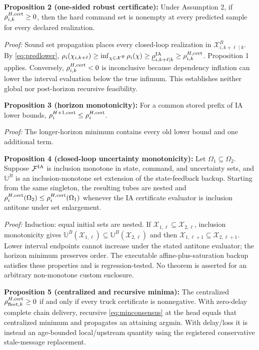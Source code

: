 \textbf{Proposition 2 (one-sided robust certificate):} Under Assumption 2, if $\rho_{i,k}^{H,{\rm cert}}\ge0$, then the hard command set is nonempty at every predicted sample for every declared realization.

\emph{Proof:} Sound set propagation places every closed-loop realization in $\mathcal X^B_{i,k+\ell\mid k}$. By \eqref{eq:predlower}, $\rho_i(\chi_{i,k+\ell})\ge\inf_{\chi\in\mathcal X^B}\rho_i(\chi)\ge\underline\rho^{\rm IA}_{i,k+\ell\mid k}\ge\rho_{i,k}^{H,{\rm cert}}$. Proposition 1 applies. Conversely, $\rho_{i,k}^{H,{\rm cert}}<0$ is inconclusive because dependency inflation can lower the interval evaluation below the true infimum. This establishes neither global nor post-horizon recursive feasibility.

\textbf{Proposition 3 (horizon monotonicity):} For a common stored prefix of IA lower bounds, $\rho_i^{H+1,{\rm cert}}\le\rho_i^{H,{\rm cert}}$.

\emph{Proof:} The longer-horizon minimum contains every old lower bound and one additional term.

\textbf{Proposition 4 (closed-loop uncertainty monotonicity):} Let $\Omega_1\subseteq\Omega_2$. Suppose $\mathcal F^{\rm IA}$ is inclusion monotone in state, command, and uncertainty sets, and $\mathbb U^B$ is an inclusion-monotone set extension of the state-feedback backup. Starting from the same singleton, the resulting tubes are nested and $\rho_i^{H,{\rm cert}}(\Omega_2)\le\rho_i^{H,{\rm cert}}(\Omega_1)$ whenever the IA certificate evaluator is inclusion antitone under set enlargement.

\emph{Proof:} Induction: equal initial sets are nested. If $\mathcal X_{1,\ell}\subseteq\mathcal X_{2,\ell}$, inclusion monotonicity gives $\mathbb U^B(\mathcal X_{1,\ell})\subseteq\mathbb U^B(\mathcal X_{2,\ell})$ and then $\mathcal X_{1,\ell+1}\subseteq\mathcal X_{2,\ell+1}$. Lower interval endpoints cannot increase under the stated antitone evaluator; the horizon minimum preserves order. The executable affine-plus-saturation backup satisfies these properties and is regression-tested. No theorem is asserted for an arbitrary non-monotone custom enclosure.

\textbf{Proposition 5 (centralized and recursive minima):} The centralized $\rho_{{\rm fleet},k}^{H,{\rm cert}}\ge0$ if and only if every truck certificate is nonnegative. With zero-delay complete chain delivery, recursive \eqref{eq:minconsensus} at the head equals that centralized minimum and propagates an attaining argmin. With delay/loss it is instead an age-bounded local/upstream quantity using the registered conservative stale-message replacement.

